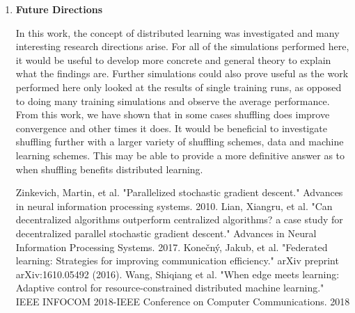 \documentclass[11pt, fullpage,letterpaper]{article}
\newcommand{\tbf}{\textbf}
\begin{document}
\begin{enumerate}
\begin{enumerate}
\end{enumerate}

\item \tbf{Future Directions}

In this work, the concept of distributed learning was investigated and many interesting research directions arise. For all of the simulations performed here, it would be useful to develop more concrete and general theory to explain what the findings are. Further simulations could also prove useful as the work performed here only looked at the results of single training runs, as opposed to doing many training simulations and observe the average performance. From this work, we have shown that in some cases shuffling does improve convergence and other times it does. It would be beneficial to investigate shuffling further with a larger variety of shuffling schemes, data and machine learning schemes. This may be able to provide a more definitive answer as to when shuffling benefits distributed learning.







\begin{thebibliography}{1}
Zinkevich, Martin, et al. "Parallelized stochastic gradient descent." Advances in neural information processing systems. 2010.
Lian, Xiangru, et al. "Can decentralized algorithms outperform centralized algorithms? a case study for decentralized parallel stochastic gradient descent." Advances in Neural Information Processing Systems. 2017.
Konečný, Jakub, et al. "Federated learning: Strategies for improving communication efficiency." arXiv preprint arXiv:1610.05492 (2016).
Wang, Shiqiang et al. "When edge meets learning: Adaptive control for resource-constrained distributed machine learning." IEEE INFOCOM 2018-IEEE Conference on Computer Communications. 2018
\end{thebibliography}
\end{enumerate}
\end{document}

